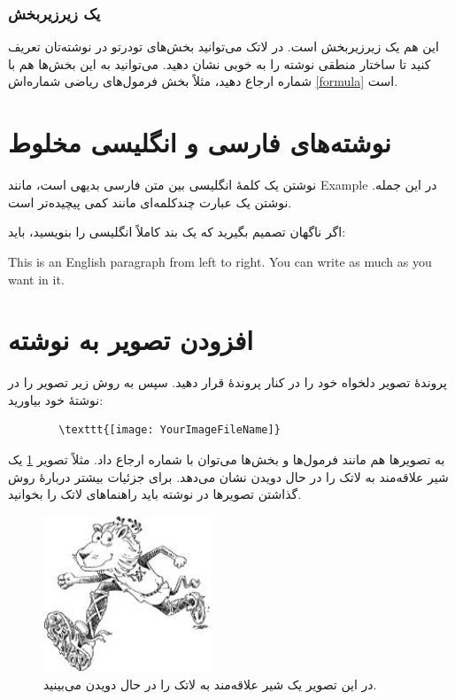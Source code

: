 \documentclass[10pt]{article}
\begin{document}
	\subsubsection{یک زیرزیربخش}
	این هم یک زیرزیربخش است. در لاتک می‌توانید بخش‌های تودرتو در نوشته‌تان تعریف کنید تا ساختار منطقی نوشته را به خوبی نشان دهید. می‌توانید به این بخش‌ها هم با شماره ارجاع دهید، مثلاً بخش فرمول‌های ریاضی شماره‌اش \ref{formula} است.
	
	\section{نوشته‌های فارسی و انگلیسی مخلوط}
	نوشتن یک کلمهٔ انگلیسی بین متن فارسی بدیهی است، مانند Example در این جمله.
	نوشتن یک عبارت چندکلمه‌ای مانند
	 کمی پیچیده‌تر است.
	
	اگر ناگهان تصمیم بگیرید که یک بند کاملاً انگلیسی را بنویسید، باید:
	\begin{latin}
		This is an English paragraph from left to right. You can write as much as you want in it.
	\end{latin}
	\section{افزودن تصویر به نوشته}
	پروندهٔ تصویر دلخواه خود را در کنار پروندهٔ  قرار دهید. سپس به روش زیر تصویر را در نوشتهٔ خود بیاورید:
	\begin{latin}
		\begin{verbatim}
		\texttt{[image: YourImageFileName]}
		\end{verbatim}
	\end{latin}
	به تصویرها هم مانند فرمول‌ها و بخش‌ها می‌توان با شماره ارجاع داد. مثلاً تصویر  \ref{shir} یک شیر علاقه‌مند به لاتک را در حال دویدن نشان می‌دهد. برای جزئیات بیشتر دربارهٔ روش گذاشتن تصویرها در نوشته باید راهنماهای لاتک را بخوانید.
	\begin{figure}%
		\centerline{\includegraphics[width=5cm]{lion}}
		\caption{\label{shir}\small در این تصویر یک شیر علاقه‌مند به لاتک را در حال دویدن می‌بینید.}
	\end{figure}
	
\end{document}
